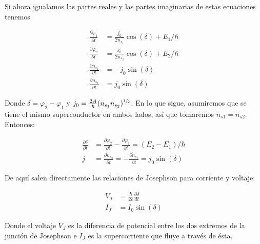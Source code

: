 Si ahora igualamos las partes reales y las partes imaginarias de estas ecuaciones tenemos

\begin{align}
    \frac{\partial \varphi_1}{\partial t} &= \frac{j_0}{2 n_{s_1}} \cos(\delta) + E_1/\hbar \\
    \frac{\partial \varphi_2}{\partial t} &= \frac{j_0}{2 n_{s_2}} \cos(\delta) + E_2/\hbar \\
    \frac{\partial n_{s_1}}{\partial t} &= -j_0 \sin(\delta) \\
    \frac{\partial n_{s_2}}{\partial t} &= j_0 \sin(\delta)
\end{align}

Donde $\delta = \varphi_2 - \varphi_1$ y $j_0 = \frac{2 A}{\hbar} (n_{s_1} n_{s_2})^{\sfrac{1}{2}}$. En lo que sigue, asumiremos que se tiene el mismo superconductor en ambos lados, así que tomaremos $n_{s1} = n_{s2}$. Entonces:

\begin{align}
    \frac{\partial \delta}{\partial t} &= \frac{\partial \varphi_2}{\partial t} - \frac{\partial \varphi_1}{\partial t} = (E_2 - E_1)/\hbar \\
    j &= \frac{\partial n_{s_2}}{\partial t} = - \frac{\partial n_{s_1}}{\partial t} = j_0 \sin(\delta)
\end{align}

De aquí salen directamente las relaciones de Josephson para corriente y voltaje:

\begin{align}
    V_J &= \frac{\hbar}{2e} \frac{\partial \delta}{d t} \\
    I_J &= I_0 \sin(\delta)
\end{align}

Donde el voltaje $V_J$ es la diferencia de potencial entre los dos extremos de la junción de Josephson e $I_J$ es la supercorriente que fluye a través de ésta.

